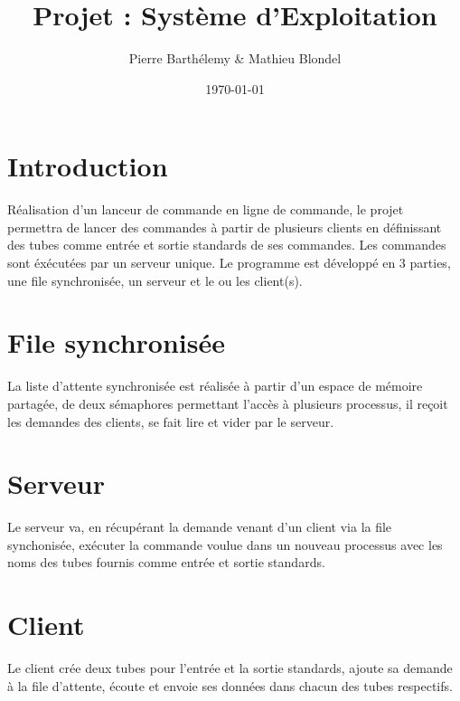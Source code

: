 \documentclass[12pt]{article}
\title{Projet : Système d'Exploitation}
\author{Pierre Barthélemy & Mathieu Blondel}
\date{\today}
\begin{document}
\maketitle
\newpage
\tableofcontents
\newpage
\section{Introduction}
    Réalisation d'un lanceur de commande en ligne de commande, le projet permettra de lancer des commandes à partir de plusieurs clients en définissant des tubes comme entrée et sortie standards de ses commandes. Les commandes sont éxécutées par un serveur unique.
    Le programme est développé en 3 parties, une file synchronisée, un serveur et le ou les client(s).
\section*{File synchronisée}
    La liste d'attente synchronisée est réalisée à partir d'un espace de mémoire partagée, de deux sémaphores permettant l'accès à plusieurs processus, il reçoit les demandes des clients, se fait lire et vider par le serveur.
\section*{Serveur}
    Le serveur va, en récupérant la demande venant d'un client via la file synchonisée, exécuter la commande voulue dans un nouveau processus avec les noms des tubes fournis comme entrée et sortie standards.
\section*{Client}
    Le client crée deux tubes pour l'entrée et la sortie standards, ajoute sa demande à la file d'attente, écoute et envoie ses données dans chacun des tubes respectifs.

\newpage
\end{document}
